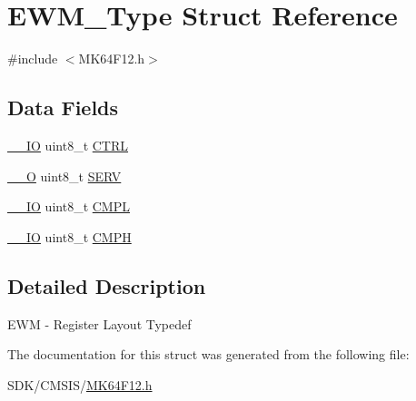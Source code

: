 \hypertarget{struct_e_w_m___type}{}\section{E\+W\+M\+\_\+\+Type Struct Reference}
\label{struct_e_w_m___type}


{\ttfamily \#include $<$M\+K64\+F12.\+h$>$}

\subsection*{Data Fields}
\begin{DoxyCompactItemize}
\item 
\mbox{\hyperlink{core__cm4_8h_aec43007d9998a0a0e01faede4133d6be}{\+\_\+\+\_\+\+IO}} uint8\+\_\+t \mbox{\hyperlink{group___v_r_e_f___peripheral___access___layer_ga80bef1f8e65ba67e749bdee702aceb9a}{C\+T\+RL}}
\item 
\mbox{\hyperlink{core__cm4_8h_a7e25d9380f9ef903923964322e71f2f6}{\+\_\+\+\_\+O}} uint8\+\_\+t \mbox{\hyperlink{group___v_r_e_f___peripheral___access___layer_ga47ffbf57d1749471af68be10a93828bf}{S\+E\+RV}}
\item 
\mbox{\hyperlink{core__cm4_8h_aec43007d9998a0a0e01faede4133d6be}{\+\_\+\+\_\+\+IO}} uint8\+\_\+t \mbox{\hyperlink{group___v_r_e_f___peripheral___access___layer_gac44f3913c6ac3424ee9b0c8a2d907df8}{C\+M\+PL}}
\item 
\mbox{\hyperlink{core__cm4_8h_aec43007d9998a0a0e01faede4133d6be}{\+\_\+\+\_\+\+IO}} uint8\+\_\+t \mbox{\hyperlink{group___v_r_e_f___peripheral___access___layer_gab53d2f0bf05dd3c526364b7df09fb906}{C\+M\+PH}}
\end{DoxyCompactItemize}


\subsection{Detailed Description}
E\+WM -\/ Register Layout Typedef 

The documentation for this struct was generated from the following file\+:\begin{DoxyCompactItemize}
\item 
S\+D\+K/\+C\+M\+S\+I\+S/\mbox{\hyperlink{_m_k64_f12_8h}{M\+K64\+F12.\+h}}\end{DoxyCompactItemize}
